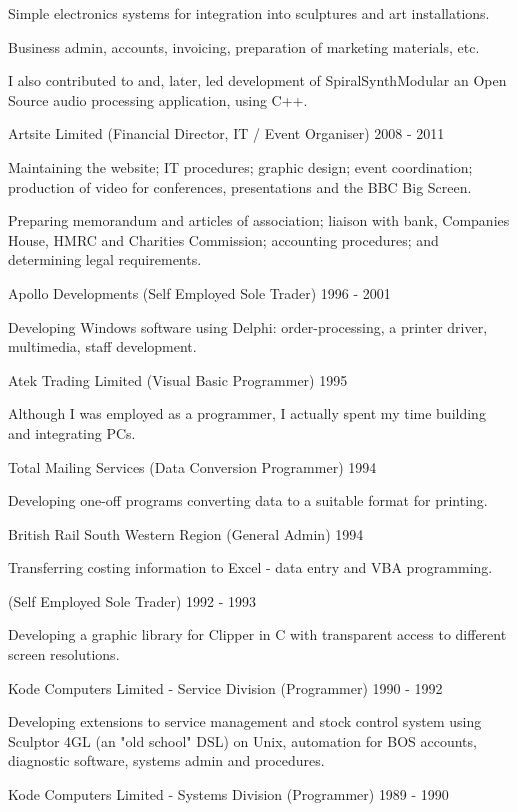 Simple electronics systems for integration into
sculptures and art installations.

Business admin, accounts, invoicing, preparation of
marketing materials, etc.

I also contributed to and, later, led development
of SpiralSynthModular an Open Source audio processing application,
using C++.

\jobHeading
    {Artsite Limited (Financial Director, IT / Event Organiser)}
    {2008 - 2011}

Maintaining the website; IT procedures; graphic design; event coordination;
production of video for conferences, presentations and the BBC Big Screen.

Preparing memorandum and articles of association;
liaison with bank, Companies House, HMRC and Charities Commission;
accounting procedures; and determining legal requirements.

\jobHeading
    {Apollo Developments (Self Employed Sole Trader)}
    {1996 - 2001}

Developing Windows software using Delphi:
order-processing, a printer driver, multimedia, staff development.

\jobHeading
    {Atek Trading Limited (Visual Basic Programmer)}
    {1995}

Although I was employed as a programmer,
I actually spent my time building and integrating PCs.

\jobHeading
    {Total Mailing Services (Data Conversion Programmer)}
    {1994}

Developing one-off programs converting data to a suitable format for printing.

\jobHeading
    {British Rail South Western Region (General Admin)}
    {1994}

Transferring costing information to Excel - data entry and VBA programming.

\jobHeading
    {(Self Employed Sole Trader)}
    {1992 - 1993}

Developing a graphic library for Clipper in C
with transparent access to different screen resolutions.

\jobHeading
    {Kode Computers Limited - Service Division (Programmer)}
    {1990 - 1992}

Developing extensions to service management
and stock control system using
Sculptor 4GL (an "old school" DSL) on Unix,
automation for BOS accounts,
diagnostic software,
systems admin and procedures.

\jobHeading
    {Kode Computers Limited - Systems Division (Programmer)}
    {1989 - 1990}

